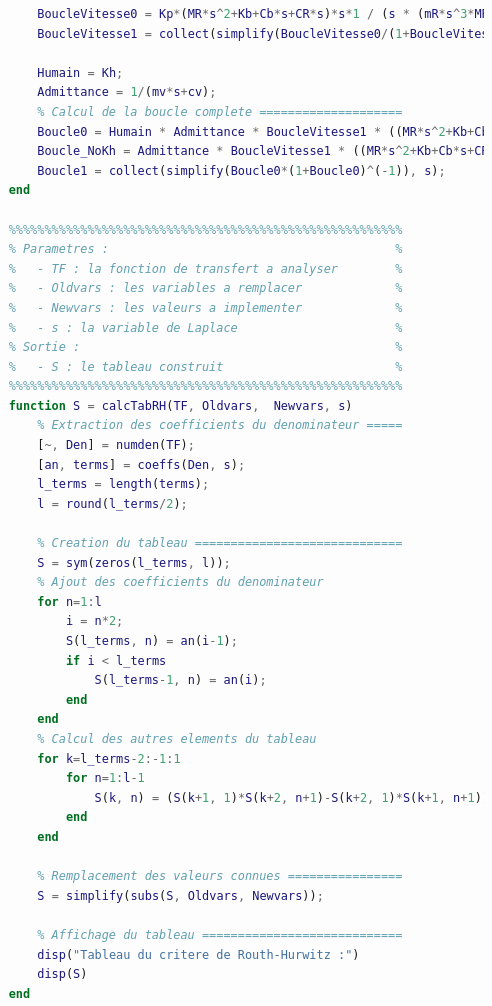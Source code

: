 \documentclass[a4paper,12pt]{article}
\begin{document}
\begin{lstlisting}[caption={Fonction simulink de calcul du compensateur}, language=Matlab]
        % Calcul de la boucle de vitesse ==================
        BoucleVitesse0 = Kp*(MR*s^2+Kb+Cb*s+CR*s)*s*1 / (s * (mR*s^3*MR + mR*s*Kb + mR*s^2*Cb + mR*s^2*CR + Kb*MR*s + Kb*CR + Cb*s^2*MR + Cb*s*CR) * (T*s+1));
        BoucleVitesse1 = collect(simplify(BoucleVitesse0/(1+BoucleVitesse0)), s);
        
        Humain = Kh;
        Admittance = 1/(mv*s+cv);
        % Calcul de la boucle complete ====================
        Boucle0 = Humain * Admittance * BoucleVitesse1 * ((MR*s^2+Kb+Cb*s+CR*s)*s)^(-1) * (Kb+Cb*s);
        Boucle_NoKh = Admittance * BoucleVitesse1 * ((MR*s^2+Kb+Cb*s+CR*s)*s)^(-1) * (Kb+Cb*s);
        Boucle1 = collect(simplify(Boucle0*(1+Boucle0)^(-1)), s);
    end
    
    %%%%%%%%%%%%%%%%%%%%%%%%%%%%%%%%%%%%%%%%%%%%%%%%%%%%%%%
    % Parametres :                                        %
    %   - TF : la fonction de transfert a analyser        %
    %   - Oldvars : les variables a remplacer             %
    %   - Newvars : les valeurs a implementer             %
    %   - s : la variable de Laplace                      %
    % Sortie :                                            %
    %   - S : le tableau construit                        %
    %%%%%%%%%%%%%%%%%%%%%%%%%%%%%%%%%%%%%%%%%%%%%%%%%%%%%%%
    function S = calcTabRH(TF, Oldvars,  Newvars, s)
        % Extraction des coefficients du denominateur =====
        [~, Den] = numden(TF);
        [an, terms] = coeffs(Den, s);
        l_terms = length(terms);
        l = round(l_terms/2);

        % Creation du tableau =============================
        S = sym(zeros(l_terms, l));
        % Ajout des coefficients du denominateur
        for n=1:l
            i = n*2;
            S(l_terms, n) = an(i-1);
            if i < l_terms
                S(l_terms-1, n) = an(i);
            end
        end
        % Calcul des autres elements du tableau
        for k=l_terms-2:-1:1
            for n=1:l-1
                S(k, n) = (S(k+1, 1)*S(k+2, n+1)-S(k+2, 1)*S(k+1, n+1))/S(k+1, 1);
            end
        end

        % Remplacement des valeurs connues ================
        S = simplify(subs(S, Oldvars, Newvars));

        % Affichage du tableau ============================
        disp("Tableau du critere de Routh-Hurwitz :")
        disp(S)
    end
    \end{lstlisting}
\end{document}
